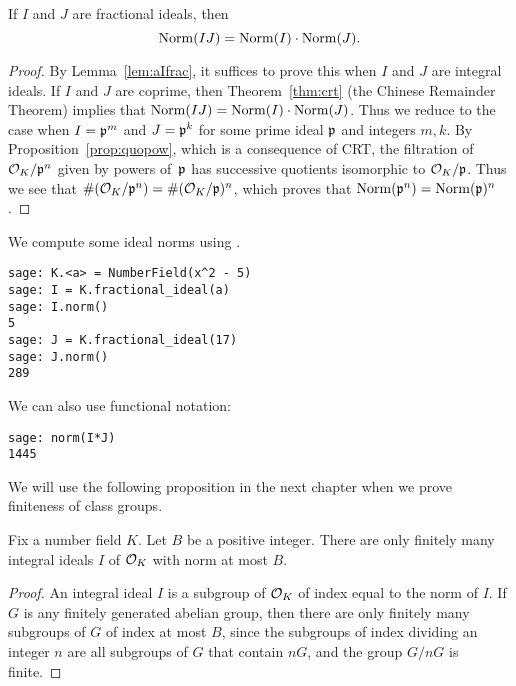 \begin{proposition}
If $I$ and $J$ are fractional ideals, then 
$$\operatorname{Norm}(IJ) = \operatorname{Norm}(I)\cdot \operatorname{Norm}(J).$$
\end{proposition}
\begin{proof}
By Lemma~\ref{lem:aIfrac}, it suffices to prove this when $I$ and $J$ are
integral ideals.  If $I$ and $J$ are coprime, then
Theorem~\ref{thm:crt} (the Chinese Remainder Theorem) implies that
$\operatorname{Norm}(IJ) = \operatorname{Norm}(I)\cdot \operatorname{Norm}(J)$.  Thus we reduce to the case when
$I=\mathfrak{p}^m$ and $J=\mathfrak{p}^k$ for some prime ideal $\mathfrak{p}$ and integers $m,k$.
By Proposition~\ref{prop:quopow}, which is
a consequence of CRT, the filtration of $\mathcal{O}_K/\mathfrak{p}^{n}$ given
by powers of~$\mathfrak{p}$ has successive quotients isomorphic to $\mathcal{O}_K/\mathfrak{p}$.
Thus  we see that $\#(\mathcal{O}_K/\mathfrak{p}^{n}) = \#(\mathcal{O}_K/\mathfrak{p})^{n}$, which proves that
$\operatorname{Norm}(\mathfrak{p}^n)=\operatorname{Norm}(\mathfrak{p})^n$.
\end{proof}

\begin{example}
We compute some ideal norms using \sage.
\begin{verbatim}
sage: K.<a> = NumberField(x^2 - 5)
sage: I = K.fractional_ideal(a)
sage: I.norm()
5
sage: J = K.fractional_ideal(17)
sage: J.norm()
289
\end{verbatim}%

\noindent{} We can also use functional notation:
\begin{verbatim}
sage: norm(I*J)
1445
\end{verbatim}
\end{example}

We will use the following proposition in the next chapter when
we prove finiteness of class groups.
\begin{proposition}\label{prop:finitewithnorm}%
Fix a number field $K$.
Let $B$ be a positive integer.  There
are only finitely many integral ideals
$I$ of $\mathcal{O}_K$ with norm at most $B$.
\end{proposition}
\begin{proof}
An integral ideal $I$ is a subgroup of $\mathcal{O}_K$ of index equal to the
norm of $I$.  If $G$ is any finitely generated abelian group, then
there are only finitely many subgroups of $G$ of index at most $B$,
since the subgroups of index dividing an integer $n$ are all subgroups
of $G$ that contain $nG$, and the group $G/nG$ is finite.  
\end{proof}

